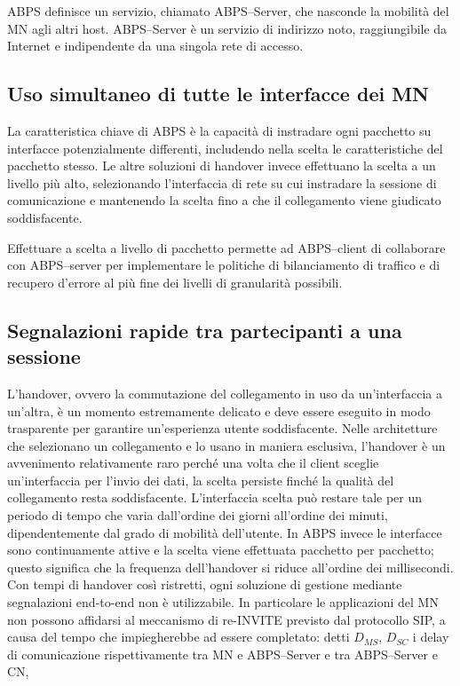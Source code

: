 \documentclass[12pt,a4paper,openright,twoside]{book}
\begin{document}
ABPS definisce un servizio, chiamato ABPS--Server, che nasconde la
mobilità del MN agli altri host. ABPS--Server è un servizio di
indirizzo noto, raggiungibile da Internet e indipendente da una
singola rete di accesso.

\subsection{Uso simultaneo di tutte le interfacce dei MN}
La caratteristica chiave di ABPS è la capacità di instradare ogni
pacchetto su interfacce potenzialmente differenti, includendo nella
scelta le caratteristiche del pacchetto stesso. Le altre soluzioni di
handover invece effettuano la scelta a un livello più alto,
selezionando l'interfaccia di rete su cui instradare la sessione di
comunicazione e mantenendo la scelta fino a che il collegamento viene
giudicato soddisfacente.

Effettuare a scelta a livello di pacchetto permette ad ABPS--client di
collaborare con ABPS--server per implementare le politiche di
bilanciamento di traffico e di recupero d'errore al più fine dei
livelli di granularità possibili.

\subsection{Segnalazioni rapide tra partecipanti a una sessione}
L'handover, ovvero la commutazione del collegamento in uso da
un'interfaccia a un'altra, è un momento estremamente delicato e deve
essere eseguito in modo trasparente per garantire un'esperienza utente
soddisfacente. Nelle architetture che selezionano un collegamento e lo
usano in maniera esclusiva, l'handover è un avvenimento relativamente
raro perché una volta che il client sceglie un'interfaccia per l'invio
dei dati, la scelta persiste finché la qualità del collegamento resta
soddisfacente. L'interfaccia scelta può restare tale per un periodo di
tempo che varia dall'ordine dei giorni all'ordine dei minuti,
dipendentemente dal grado di mobilità dell'utente. In ABPS invece le
interfacce sono continuamente attive e la scelta viene effettuata
pacchetto per pacchetto; questo significa che la frequenza
dell'handover si riduce all'ordine dei millisecondi. Con tempi di
handover così ristretti, ogni soluzione di gestione mediante
segnalazioni end-to-end non è utilizzabile. In particolare le
applicazioni del MN non possono affidarsi al meccanismo di re-INVITE
previsto dal protocollo SIP, a causa del tempo che impiegherebbe ad
essere completato: detti $D_{MS}$, $D_{SC}$ i delay di comunicazione
rispettivamente tra MN e ABPS--Server e tra ABPS--Server e CN,
\end{document}
